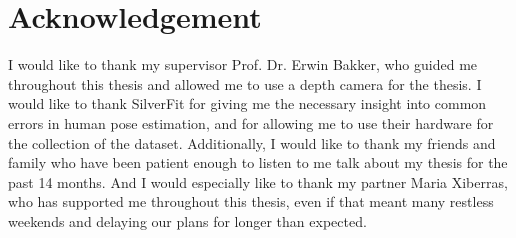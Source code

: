 \chapter*{Acknowledgement}
\label{sec:acknowledgement}
\thispagestyle{empty}

I would like to thank my supervisor Prof. Dr. Erwin Bakker, who guided me throughout this thesis and allowed me to use a depth camera for the thesis. I would like to thank SilverFit for giving me the necessary insight into common errors in human pose estimation, and for allowing me to use their hardware for the collection of the dataset. Additionally, I would like to thank my friends and family who have been patient enough to listen to me talk about my thesis for the past 14 months. And I would especially like to thank my partner Maria Xiberras, who has supported me throughout this thesis, even if that meant many restless weekends and delaying our plans for longer than expected.

\clearpage